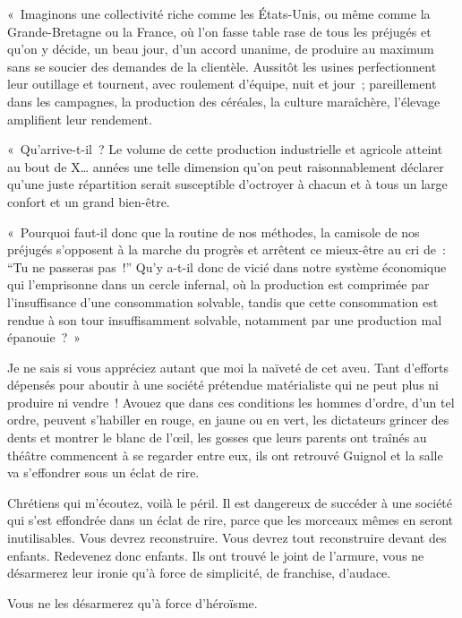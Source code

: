 \documentclass[french,twoside]{book} %
\begin{document}
« Imaginons une collectivité riche comme les États-Unis, ou même comme la Grande-Bretagne ou la France, où l’on fasse table rase de tous les préjugés et qu’on y décide, un beau jour, d’un accord unanime, de produire au maximum sans se soucier des demandes de la clientèle. Aussitôt les usines perfectionnent leur outillage et tournent, avec roulement d’équipe, nuit et jour ; pareillement dans les campagnes, la production des céréales, la culture maraîchère, l’élevage amplifient leur rendement.\par
« Qu’arrive-t-il ? Le volume de cette production industrielle et agricole atteint au bout de X… années une telle dimension qu’on peut raisonnablement déclarer qu’une juste répartition serait susceptible d’octroyer à chacun et à tous un large confort et un grand bien-être.\par
« Pourquoi faut-il donc que la routine de nos méthodes, la camisole de nos préjugés s’opposent à la marche du progrès et arrêtent ce mieux-être au cri de : “Tu ne passeras pas !” Qu’y a-t-il donc de vicié dans notre système économique qui l’emprisonne dans un cercle infernal, où la production est comprimée par l’insuffisance d’une consommation solvable, tandis que cette consommation est rendue à son tour insuffisamment solvable, notamment par une production mal épanouie ? »\par
\bigbreak
\noindent Je ne sais si vous appréciez autant que moi la naïveté de cet aveu. Tant d’efforts dépensés pour aboutir à une société prétendue matérialiste qui ne peut plus ni produire ni vendre ! Avouez que dans ces conditions les hommes d’ordre, d’un tel ordre, peuvent s’habiller en rouge, en jaune ou en vert, les dictateurs grincer des dents et montrer le blanc de l’œil, les gosses que leurs parents ont traînés au théâtre commencent à se regarder entre eux, ils ont retrouvé Guignol et la salle va s’effondrer sous un éclat de rire.\par
\bigbreak
\noindent Chrétiens qui m’écoutez, voilà le péril. Il est dangereux de succéder à une société qui s’est effondrée dans un éclat de rire, parce que les morceaux mêmes en seront inutilisables. Vous devrez reconstruire. Vous devrez tout reconstruire devant des enfants. Redevenez donc enfants. Ils ont trouvé le joint de l’armure, vous ne désarmerez leur ironie qu’à force de simplicité, de franchise, d’audace.\par
Vous ne les désarmerez qu’à force d’héroïsme.\par
 \par
\end{document}

